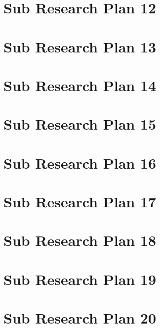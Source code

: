 \section{Sub Research Plan 12}
\section{Sub Research Plan 13}
\section{Sub Research Plan 14}
\section{Sub Research Plan 15}
\section{Sub Research Plan 16}
\section{Sub Research Plan 17}
\section{Sub Research Plan 18}
\section{Sub Research Plan 19}
\section{Sub Research Plan 20}